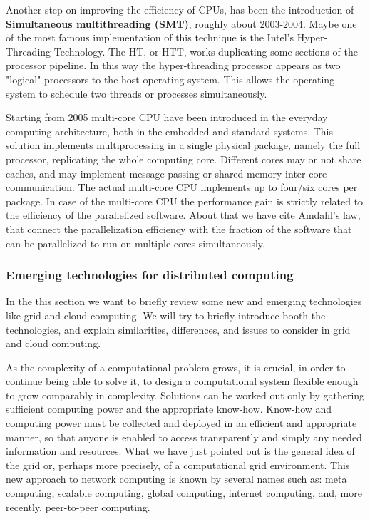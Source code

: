 Another step on improving the efficiency of CPUs, has been the introduction of {\bf Simultaneous multithreading (SMT)}, roughly about 2003-2004. Maybe one of the most famous implementation of 
this technique is the Intel's Hyper-Threading Technology. The HT, or HTT, works duplicating some sections of the processor pipeline. In this way the hyper-threading processor appears as two "logical" processors to the host operating system. This allows the operating system to schedule two threads or processes simultaneously.     

Starting from 2005 multi-core CPU have been introduced in the everyday computing architecture, both in the embedded and standard systems. This solution implements multiprocessing in a single physical package, namely the full processor, replicating the whole computing core. Different cores may or not share caches, and may implement message passing or shared-memory inter-core communication. The actual multi-core CPU implements up to four/six cores 
per package. In case of the multi-core CPU the performance gain is strictly related to the efficiency
of the parallelized software. About that we have cite Amdahl's law\cite{Amdahl}, that connect the parallelization
efficiency with the fraction of the software that can be parallelized to run on multiple cores simultaneously.
\FloatBarrier
\subsubsection{Emerging technologies for distributed computing}

In the this section we want to briefly review some new and emerging
technologies like grid and cloud computing. We will try to briefly introduce
booth the technologies, and explain similarities, differences, and issues to 
consider in grid and cloud computing.

As the complexity of a computational problem grows, it is crucial, in
order to continue being able to solve it, to design a computational
system flexible enough to grow comparably in complexity. Solutions can
be worked out only by gathering sufficient computing power and
the appropriate know-how. 
Know-how and computing power must be collected and deployed
in an efficient
and appropriate manner, so that anyone is enabled to access
transparently and simply any needed information and resources. 
What we have just pointed out is the general idea of the grid or,
perhaps more precisely, of a computational grid environment. This new
approach to network computing is known by several names such as:
meta computing, scalable computing, global computing, internet computing,
and, more recently, peer-to-peer computing.

